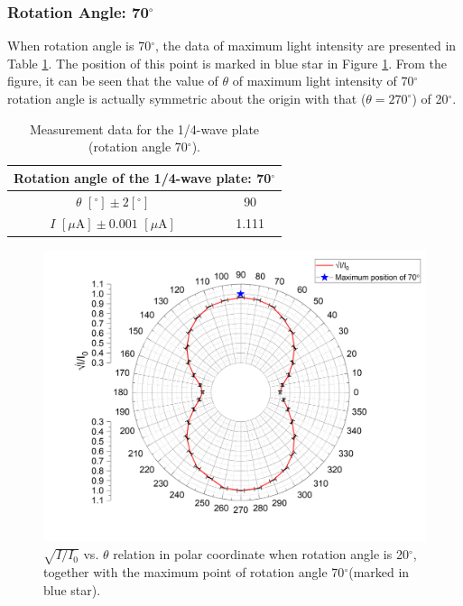 \documentclass{article}
\begin{document}
\subsubsection{Rotation Angle: 70$^\circ$}

When rotation angle is 70$^\circ$, the data of maximum light intensity are presented in Table \ref{Table70}. The position of this point is marked in blue star in Figure \ref{Fig70}. From the figure, it can be seen that the value of $\theta$ of maximum light intensity of 70$^\circ$ rotation angle is actually symmetric about the origin with that ($\theta = 270^\circ$) of 20$^\circ$. 

\begin{table}[H]\centering
\begin{tabular}{cc}
\toprule
\multicolumn{2}{c}{Rotation angle of the 1/4-wave plate: 70$^\circ$}\\
\midrule
$\theta\,\,[^\circ] \pm 2[^\circ]$ & 90 \\
$I\,\,[\mu\text{A}] \pm 0.001\,\,[\mu\text{A}]$ & 1.111 \\
\bottomrule
\end{tabular}
\caption{Measurement data for the 1/4-wave plate (rotation angle 70$^\circ$).}\label{Table70}
\end{table}

\begin{figure}[H]\centering
\includegraphics[scale=0.6]{7.png}
\caption{$\sqrt{I/I_0}$ vs. $\theta$ relation in polar coordinate when rotation angle is 20$^\circ$, together with the maximum point of rotation angle 70$^\circ$(marked in blue star).}\label{Fig70}
\end{figure}
\end{document}
